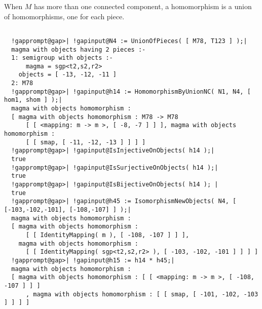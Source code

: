 \documentclass[a4paper,11pt]{report}
\begin{document}
{{{ When $M$ has more than one connected component, a homomorphism is a union of
homomorphisms, one for each piece. }

 
\begin{Verbatim}[commandchars=!@|,fontsize=\small,frame=single,label=Example]
  
  !gapprompt@gap>| !gapinput@N4 := UnionOfPieces( [ M78, T123 ] );|
  magma with objects having 2 pieces :-
  1: semigroup with objects :-
      magma = sgp<t2,s2,r2>
    objects = [ -13, -12, -11 ]
  2: M78
  !gapprompt@gap>| !gapinput@h14 := HomomorphismByUnionNC( N1, N4, [ hom1, shom ] );|
  magma with objects homomorphism : 
  [ magma with objects homomorphism : M78 -> M78
      [ [ <mapping: m -> m >, [ -8, -7 ] ] ], magma with objects homomorphism : 
      [ [ smap, [ -11, -12, -13 ] ] ] ]
  !gapprompt@gap>| !gapinput@IsInjectiveOnObjects( h14 );|
  true
  !gapprompt@gap>| !gapinput@IsSurjectiveOnObjects( h14 );|
  true
  !gapprompt@gap>| !gapinput@IsBijectiveOnObjects( h14 ); |
  true
  !gapprompt@gap>| !gapinput@h45 := IsomorphismNewObjects( N4, [ [-103,-102,-101], [-108,-107] ] );|
  magma with objects homomorphism : 
  [ magma with objects homomorphism : 
      [ [ IdentityMapping( m ), [ -108, -107 ] ] ], 
    magma with objects homomorphism : 
      [ [ IdentityMapping( sgp<t2,s2,r2> ), [ -103, -102, -101 ] ] ] ]
  !gapprompt@gap>| !gapinput@h15 := h14 * h45;|
  magma with objects homomorphism : 
  [ magma with objects homomorphism : [ [ <mapping: m -> m >, [ -108, -107 ] ] ]
      , magma with objects homomorphism : [ [ smap, [ -101, -102, -103 ] ] ] ]
  
\end{Verbatim}
 }

 }

            
\end{document}
